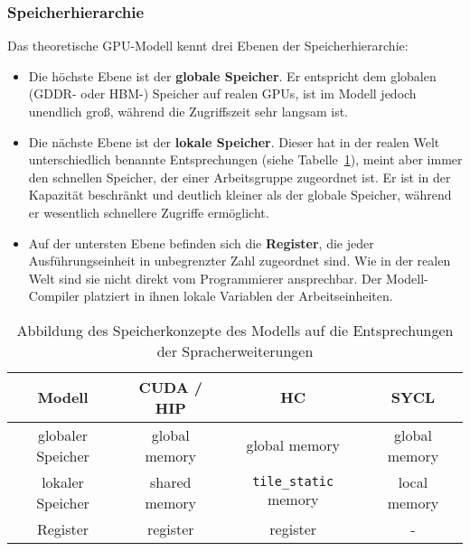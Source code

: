 \subsubsection{Speicherhierarchie}
\label{methoden:konzepte:speicher}

Das theoretische GPU-Modell kennt drei Ebenen der Speicherhierarchie:

\begin{itemize}
    \item Die höchste Ebene ist der \textbf{globale Speicher}. Er entspricht dem
          globalen (GDDR- oder HBM-) Speicher auf realen GPUs, ist im Modell
          jedoch unendlich groß, während die Zugriffszeit sehr langsam ist.
    \item Die nächste Ebene ist der \textbf{lokale Speicher}. Dieser hat in der
          realen Welt unterschiedlich benannte Entsprechungen
          (siehe Tabelle~\ref{methoden:konzepte:speicher:tabelle}), meint aber
          immer den schnellen Speicher, der einer Arbeitsgruppe zugeordnet ist.
          Er ist in der Kapazität beschränkt und deutlich kleiner als der
          globale Speicher, während er wesentlich schnellere Zugriffe
          ermöglicht.
    \item Auf der untersten Ebene befinden sich die \textbf{Register}, die jeder
          Ausführungseinheit in unbegrenzter Zahl zugeordnet sind. Wie in der
          realen Welt sind sie nicht direkt vom Programmierer ansprechbar. Der
          Modell-Compiler platziert in ihnen lokale Variablen der
          Arbeitseinheiten.
\end{itemize}

\begin{table}[htb]
    \centering
    \begin{tabular}{|c|c|c|c|}
        \hline
        Modell & CUDA / HIP & HC & SYCL\\ \hline
        globaler Speicher & global memory & global memory & global memory\\
        \hline
        lokaler Speicher & shared memory & \texttt{tile\_static} memory &
        local memory \\
        \hline
        Register & register & register & -\\ \hline
    \end{tabular}
    \caption{Abbildung des Speicherkonzepte des Modells auf die Entsprechungen
             der Spracherweiterungen}
    \label{methoden:konzepte:speicher:tabelle}
\end{table}

